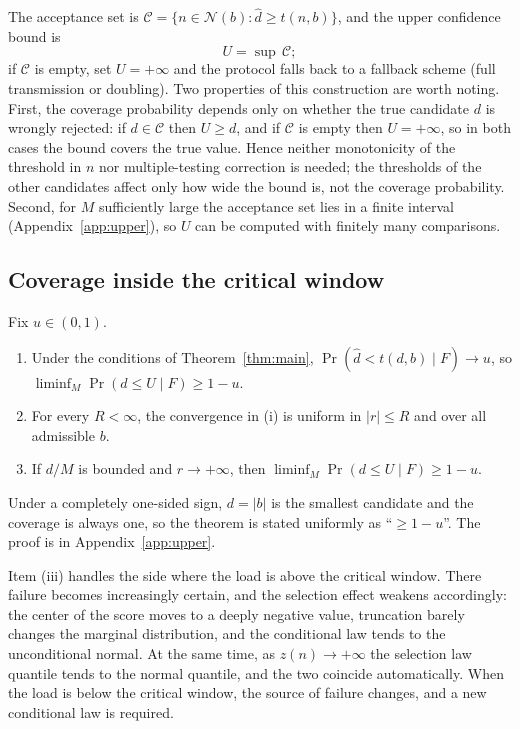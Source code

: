The acceptance set is $\mathcal C = \{n \in \mathcal N(b) : \widehat d \ge t(n,b)\}$, and the upper
confidence bound is
\begin{equation*}
U = \sup\,\mathcal C;
\end{equation*}
if $\mathcal C$ is empty, set $U = +\infty$ and the protocol falls back to a fallback scheme (full
transmission or doubling). Two properties of this construction are worth noting. First, the coverage
probability depends only on whether the true candidate $d$ is wrongly rejected: if $d \in \mathcal C$ then
$U \ge d$, and if $\mathcal C$ is empty then $U = +\infty$, so in both cases the bound covers the true
value. Hence neither monotonicity of the threshold in $n$ nor multiple-testing correction is needed; the
thresholds of the other candidates affect only how wide the bound is, not the coverage probability.
Second, for $M$ sufficiently large the acceptance set lies in a finite interval (Appendix~\ref{app:upper}),
so $U$ can be computed with finitely many comparisons.

\subsection{Coverage inside the critical window}\label{sec:upper-cover}
\begin{theorem}\label{thm:upper}
Fix $u \in (0,1)$.
\begin{enumerate}[label=(\roman*)]
\item Under the conditions of Theorem~\ref{thm:main}, $\Pr(\widehat d < t(d,b) \mid F) \to u$,
so $\liminf_M \Pr(d \le U \mid F) \ge 1-u$.
\item For every $R < \infty$, the convergence in (i) is uniform in $|r| \le R$ and over all admissible $b$.
\item If $d/M$ is bounded and $r \to +\infty$, then
$\liminf_M \Pr(d \le U \mid F) \ge 1-u$.
\end{enumerate}
\end{theorem}
Under a completely one-sided sign, $d = |b|$ is the smallest candidate and the coverage is always one, so
the theorem is stated uniformly as ``$\ge 1-u$''. The proof is in Appendix~\ref{app:upper}.

Item (iii) handles the side where the load is above the critical window. There failure becomes increasingly
certain, and the selection effect weakens accordingly: the center of the score moves to a deeply negative
value, truncation barely changes the marginal distribution, and the conditional law tends to the
unconditional normal. At the same time, as $z(n) \to +\infty$ the selection law quantile tends to the
normal quantile, and the two coincide automatically. When the load is below the critical window, the source
of failure changes, and a new conditional law is required.
